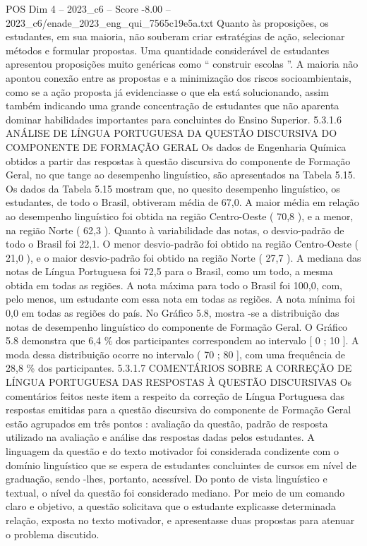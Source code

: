 \begin{textsample}{POS Dim 4 – 2023\_c6 – Score -8.00 – 2023\_c6/enade\_2023\_eng\_qui\_7565c19e5a.txt}
Quanto às proposições, os estudantes, em sua maioria, não souberam criar estratégias de ação, selecionar métodos e formular propostas.
Uma quantidade considerável de estudantes apresentou proposições muito genéricas como “ construir escolas ”.
A maioria não apontou conexão entre as propostas e a minimização dos riscos socioambientais, como se a ação proposta já evidenciasse o que ela está solucionando, assim também indicando uma grande concentração de estudantes que não aparenta dominar habilidades importantes para concluintes do Ensino Superior. 5.3.1.6 ANÁLISE DE LÍNGUA PORTUGUESA DA QUESTÃO DISCURSIVA DO COMPONENTE DE FORMAÇÃO GERAL Os dados de Engenharia Química obtidos a partir das respostas à questão discursiva do componente de Formação Geral, no que tange ao desempenho linguístico, são apresentados na Tabela 5.15.
Os dados da Tabela 5.15 mostram que, no quesito desempenho linguístico, os estudantes, de todo o Brasil, obtiveram média de 67,0.
A maior média em relação ao desempenho linguístico foi obtida na região Centro-Oeste ( 70,8 ), e a menor, na região Norte ( 62,3 ).
Quanto à variabilidade das notas, o desvio-padrão de todo o Brasil foi 22,1.
O menor desvio-padrão foi obtido na região Centro-Oeste ( 21,0 ), e o maior desvio-padrão foi obtido na região Norte ( 27,7 ).
A mediana das notas de Língua Portuguesa foi 72,5 para o Brasil, como um todo, a mesma obtida em todas as regiões.
A nota máxima para todo o Brasil foi 100,0, com, pelo menos, um estudante com essa nota em todas as regiões.
A nota mínima foi 0,0 em todas as regiões do país.
No Gráfico 5.8, mostra -se a distribuição das notas de desempenho linguístico do componente de Formação Geral.
O Gráfico 5.8 demonstra que 6,4 \% dos participantes correspondem ao intervalo [ 0 ; 10 ].
A moda dessa distribuição ocorre no intervalo ( 70 ; 80 ], com uma frequência de 28,8 \% dos participantes. 5.3.1.7 COMENTÁRIOS SOBRE A CORREÇÃO DE LÍNGUA PORTUGUESA DAS RESPOSTAS À QUESTÃO DISCURSIVAS Os comentários feitos neste item a respeito da correção de Língua Portuguesa das respostas emitidas para a questão discursiva do componente de Formação Geral estão agrupados em três pontos : avaliação da questão, padrão de resposta utilizado na avaliação e análise das respostas dadas pelos estudantes.
A linguagem da questão e do texto motivador foi considerada condizente com o domínio linguístico que se espera de estudantes concluintes de cursos em nível de graduação, sendo -lhes, portanto, acessível.
Do ponto de vista linguístico e textual, o nível da questão foi considerado mediano.
Por meio de um comando claro e objetivo, a questão solicitava que o estudante explicasse determinada relação, exposta no texto motivador, e apresentasse duas propostas para atenuar o problema discutido.

\end{textsample}
